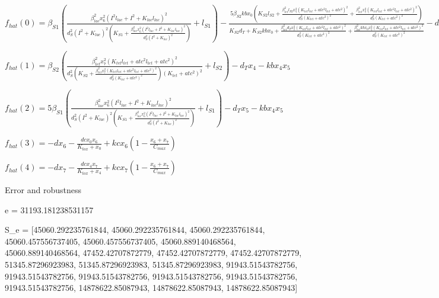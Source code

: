 $f_{hat}(0)=\beta_{S1} \left(\frac{\beta_{lac}^{2} x_{6}^{2} \left(I^{2} l_{lac} + I^{2} + K_{lac} l_{lac}\right)^{2}}{d_{S}^{2} \left(I^{2} + K_{lac}\right)^{2} \left(K_{S1} + \frac{\beta_{lac}^{2} x_{6}^{2} \left(I^{2} l_{lac} + I^{2} + K_{lac} l_{lac}\right)^{2}}{d_{S}^{2} \left(I^{2} + K_{lac}\right)^{2}}\right)} + l_{S1}\right) - \frac{5 \beta_{S2} kb x_{0} \left(K_{S2} l_{S2} + \frac{\beta_{tet}^{2} l_{S2} x_{7}^{2} \left(K_{tet} l_{tet} + atc^{2} l_{tet} + atc^{2}\right)^{2}}{d_{S}^{2} \left(K_{tet} + atc^{2}\right)^{2}} + \frac{\beta_{tet}^{2} x_{7}^{2} \left(K_{tet} l_{tet} + atc^{2} l_{tet} + atc^{2}\right)^{2}}{d_{S}^{2} \left(K_{tet} + atc^{2}\right)^{2}}\right)}{K_{S2} d_{T} + K_{S2} kb x_{0} + \frac{\beta_{tet}^{2} d_{T} x_{7}^{2} \left(K_{tet} l_{tet} + atc^{2} l_{tet} + atc^{2}\right)^{2}}{d_{S}^{2} \left(K_{tet} + atc^{2}\right)^{2}} + \frac{\beta_{tet}^{2} kb x_{0} x_{7}^{2} \left(K_{tet} l_{tet} + atc^{2} l_{tet} + atc^{2}\right)^{2}}{d_{S}^{2} \left(K_{tet} + atc^{2}\right)^{2}}} - d_{T} x_{0}$


$f_{hat}(1)=\beta_{S2} \left(\frac{\beta_{tet}^{2} x_{7}^{2} \left(K_{tet} l_{tet} + atc^{2} l_{tet} + atc^{2}\right)^{2}}{d_{S}^{2} \left(K_{S2} + \frac{\beta_{tet}^{2} x_{7}^{2} \left(K_{tet} l_{tet} + atc^{2} l_{tet} + atc^{2}\right)^{2}}{d_{S}^{2} \left(K_{tet} + atc^{2}\right)^{2}}\right) \left(K_{tet} + atc^{2}\right)^{2}} + l_{S2}\right) - d_{T} x_{4} - kb x_{4} x_{5}$


$f_{hat}(2)=5 \beta_{S1} \left(\frac{\beta_{lac}^{2} x_{6}^{2} \left(I^{2} l_{lac} + I^{2} + K_{lac} l_{lac}\right)^{2}}{d_{S}^{2} \left(I^{2} + K_{lac}\right)^{2} \left(K_{S1} + \frac{\beta_{lac}^{2} x_{6}^{2} \left(I^{2} l_{lac} + I^{2} + K_{lac} l_{lac}\right)^{2}}{d_{S}^{2} \left(I^{2} + K_{lac}\right)^{2}}\right)} + l_{S1}\right) - d_{T} x_{5} - kb x_{4} x_{5}$


$f_{hat}(3)=- d x_{6} - \frac{dc x_{0} x_{6}}{K_{tox} + x_{0}} + kc x_{6} \left(1 - \frac{x_{6} + x_{7}}{C_{max}}\right)$


$f_{hat}(4)=- d x_{7} - \frac{dc x_{4} x_{7}}{K_{tox} + x_{4}} + kc x_{7} \left(1 - \frac{x_{6} + x_{7}}{C_{max}}\right)$



Error and robustness 


e = 31193.181238531157

S_e = [45060.292235761844, 45060.292235761844, 45060.292235761844, 45060.457556737405, 45060.457556737405, 45060.889140468564, 45060.889140468564, 47452.42707872779, 47452.42707872779, 47452.42707872779, 51345.87296923983, 51345.87296923983, 51345.87296923983, 91943.51543782756, 91943.51543782756, 91943.51543782756, 91943.51543782756, 91943.51543782756, 91943.51543782756, 14878622.85087943, 14878622.85087943, 14878622.85087943]

